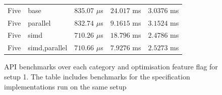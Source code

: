 \documentclass[11pt]{report}
\theoremstyle{definition}
\theoremstyle{plain}
\begin{document}
\begin{figure}
\begin{tabular}{l|l|lll}
    Five                  & base          & $835.07$ $\mu$s & $24.017$ ms & $3.0376$ ms     \\
    Five                  & parallel      & $832.74$ $\mu$s & $9.1615$ ms & $3.1524$ ms     \\
    Five                  & simd          & $710.26$ $\mu$s & $18.796$ ms & $2.4786$ ms     \\
    Five                  & simd,parallel & $710.66$ $\mu$s & $7.9276$ ms & $2.5273$ ms     \\
    \hline
  \end{tabular}
  \caption{API benchmarks over each category and optimisation feature flag for setup 1. The table includes benchmarks for the specification implementations run on the same setup}\label{fig:api_benchmarks_dell}
\end{figure}
\end{document}
